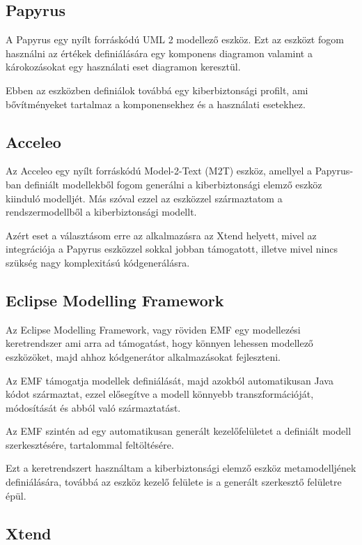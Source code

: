 \subsection{Papyrus}

A Papyrus egy nyílt forráskódú UML 2 modellező eszköz. Ezt az eszközt fogom használni az értékek definiálására egy komponens diagramon valamint a károkozásokat egy használati eset diagramon keresztül.

Ebben az eszközben definiálok továbbá egy kiberbiztonsági profilt, ami bővítményeket tartalmaz a komponensekhez és a használati esetekhez.

\subsection{Acceleo}

Az Acceleo egy nyílt forráskódú Model-2-Text (M2T) eszköz, amellyel a Papyrus-ban definiált modellekből fogom generálni a kiberbiztonsági elemző eszköz kiinduló modelljét. Más szóval ezzel az eszközzel származtatom a rendszermodellből a kiberbiztonsági modellt.

Azért eset a választásom erre az alkalmazásra az Xtend helyett, mivel az integrációja a Papyrus eszközzel sokkal jobban támogatott, illetve mivel nincs szükség nagy komplexitású kódgenerálásra.

\subsection{Eclipse Modelling Framework}

Az Eclipse Modelling Framework, vagy röviden EMF egy modellezési keretrendszer ami arra ad támogatást, hogy könnyen lehessen modellező eszközöket, majd ahhoz kódgenerátor alkalmazásokat fejleszteni.

Az EMF támogatja modellek definiálását, majd azokból automatikusan Java kódot származtat, ezzel elősegítve a modell könnyebb transzformációját, módosítását és abból való származtatást.

Az EMF szintén ad egy automatikusan generált kezelőfelületet a definiált modell szerkesztésére, tartalommal feltöltésére.

Ezt a keretrendszert használtam a kiberbiztonsági elemző eszköz metamodelljének definiálására, továbbá az eszköz kezelő felülete is a generált szerkesztő felületre épül.

\subsection{Xtend}


